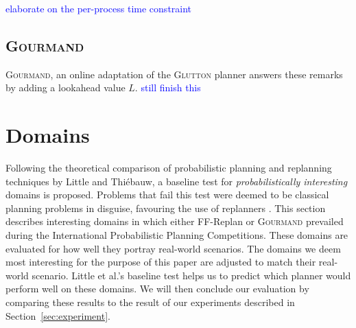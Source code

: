 \documentclass[runningheads,a4paper]{llncs}
\newcommand\todo[1]{\textcolor{blue}{#1}}
\begin{document}
\todo{elaborate on the per-process time constraint}

\subsection{\textsc{Gourmand}}
\textsc{Gourmand}, an online adaptation of the \textsc{Glutton} planner answers these remarks by adding a lookahead value $L$. \todo{still finish this}




\section{Domains}
Following the theoretical comparison of probabilistic planning and replanning techniques by Little and Thi\'ebauw, a baseline test for \emph{probabilistically interesting} domains is proposed. Problems that fail this test were deemed to be classical planning problems in disguise, favouring the use of replanners \cite{little2007probvsreplan}. This section describes interesting domains in which either FF-Replan or \textsc{Gourmand} prevailed during the International Probabilistic Planning Competitions. These domains are evaluated for how well they portray real-world scenarios. The domains we deem most interesting for the purpose of this paper are adjusted to match their real-world scenario. Little et al.'s baseline test helps us to predict which planner would perform well on these domains. We will then conclude our evaluation by comparing these results to the result of our experiments described in Section~\ref{sec:experiment}.
\end{document}

